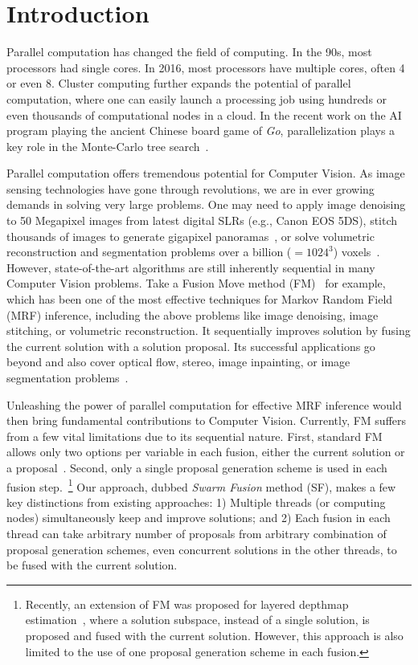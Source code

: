 \section{Introduction}

Parallel computation has changed the field of computing.  In the 90s,
most processors had single cores. In 2016, most processors have multiple
cores, often 4 or even 8. Cluster computing further expands the
potential of parallel computation, where one can easily launch a
processing job using hundreds or even thousands of computational nodes
in a cloud.
%
In the recent work on the AI program playing the ancient Chinese board
game of {\it Go}, parallelization plays a key role in the Monte-Carlo
tree search~\cite{silver2016mastering}.


Parallel computation offers tremendous potential for Computer Vision. As
image sensing technologies have gone through revolutions, we are in
ever growing demands in solving very large problems. One may need to
apply image denoising to 50 Megapixel images from latest digital
SLRs (e.g., Canon EOS 5DS), stitch thousands of images to generate gigapixel
panoramas~\cite{kopf2007capturing}, or solve volumetric reconstruction and
segmentation problems over a billion ($=1024^3$)
voxels~\cite{hane2013joint}.
%
%
However, state-of-the-art algorithms are still inherently sequential
in many Computer Vision problems. Take a Fusion Move method
(FM)~\cite{fusion_flow,fusion_moves_for_markov_random_field_optimization,second_order_stereo}
for example, which has been one of the most effective techniques for
Markov Random Field (MRF) inference, including the above problems like
image denoising, image stitching, or volumetric reconstruction.
%
It sequentially improves solution by fusing the current solution with a
solution proposal. Its successful applications go beyond and also cover
optical flow, stereo, image inpainting, or image segmentation
problems~\cite{fusion_moves_for_markov_random_field_optimization}.


Unleashing the power of parallel computation for effective MRF inference
would then bring fundamental contributions to Computer
Vision. Currently, FM suffers from a few vital limitations due to its
sequential nature. First, standard FM allows only two options per
variable in each fusion, either the current solution or a
proposal~\cite{fusion_moves_for_markov_random_field_optimization}. Second,
only a single proposal generation scheme is used in each fusion
step.~\footnote{Recently, an extension of FM was proposed for layered
depthmap estimation~\cite{layered_depthmap}, where a solution subspace, instead
of a single solution, is proposed and fused with the current
solution. However, this approach is also limited to the use of one proposal
generation scheme in each fusion.}
%
Our approach, dubbed {\it Swarm Fusion} method (SF), makes a
few key distinctions from existing approaches: 1) Multiple threads (or
computing nodes) simultaneously keep and improve solutions; and 2) Each
fusion in each thread can take arbitrary number of proposals from
arbitrary combination of proposal generation schemes, even concurrent
solutions in the other threads, to be fused with the current solution.
%


